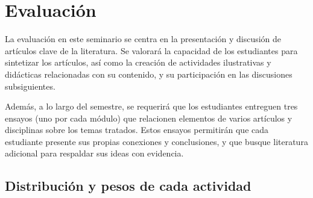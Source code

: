 \documentclass[11pt,a4paper,]{awesome-cv}
\begin{document}
\hypertarget{evaluaciuxf3n}{%
\section{Evaluación}\label{evaluaciuxf3n}}

\begin{footnotesize}
La evaluación en este seminario se centra en la presentación y discusión de artículos clave de la literatura. Se valorará la capacidad de los estudiantes para sintetizar los artículos, así como la creación de actividades ilustrativas y didácticas relacionadas con su contenido, y su participación en las discusiones subsiguientes.

Además, a lo largo del semestre, se requerirá que los estudiantes entreguen tres ensayos (uno por cada módulo) que relacionen elementos de varios artículos y disciplinas sobre los temas tratados. Estos ensayos permitirán que cada estudiante presente sus propias conexiones y conclusiones, y que busque literatura adicional para respaldar sus ideas con evidencia.
\end{footnotesize}

\hypertarget{distribuciuxf3n-y-pesos-de-cada-actividad}{%
\subsection{Distribución y pesos de cada
actividad}\label{distribuciuxf3n-y-pesos-de-cada-actividad}}

\begin{cventries}
\end{cventries}
\end{document}
